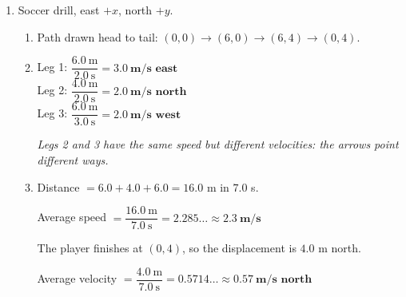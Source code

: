 \documentclass[12pt, twoside]{article}
\begin{document}
\begin{enumerate}[itemsep=0.4cm]
\item Soccer drill, east $+x$, north $+y$.

  \begin{minipage}[t]{0.56\linewidth}
    \vspace{0pt}
    \begin{enumerate}[itemsep=0.25cm]
      \item Path drawn head to tail: $(0,0) \to (6,0) \to (6,4) \to (0,4)$.
      \item Leg 1: $\dfrac{6.0~\text{m}}{2.0~\text{s}} = \mathbf{3.0~\textbf{m/s east}}$
        \\[0.2cm]
        Leg 2: $\dfrac{4.0~\text{m}}{2.0~\text{s}} = \mathbf{2.0~\textbf{m/s north}}$
        \\[0.2cm]
        Leg 3: $\dfrac{6.0~\text{m}}{3.0~\text{s}} = \mathbf{2.0~\textbf{m/s west}}$

        \emph{Legs 2 and 3 have the same speed but different velocities: the arrows
        point different ways.}
      \item Distance $= 6.0 + 4.0 + 6.0 = 16.0$ m in $7.0$ s.

        Average speed $= \dfrac{16.0~\text{m}}{7.0~\text{s}} = 2.285\ldots
        \approx \mathbf{2.3~\textbf{m/s}}$

        The player finishes at $(0,4)$, so the displacement is $4.0$ m north.

        Average velocity $= \dfrac{4.0~\text{m}}{7.0~\text{s}} = 0.5714\ldots
        \approx \mathbf{0.57~\textbf{m/s north}}$
    \end{enumerate}
  \end{minipage}
  \hfill
  \begin{minipage}[t]{0.4\linewidth}
    \vspace{0pt}
    \centering


\end{minipage}
\end{enumerate}
\end{document}
